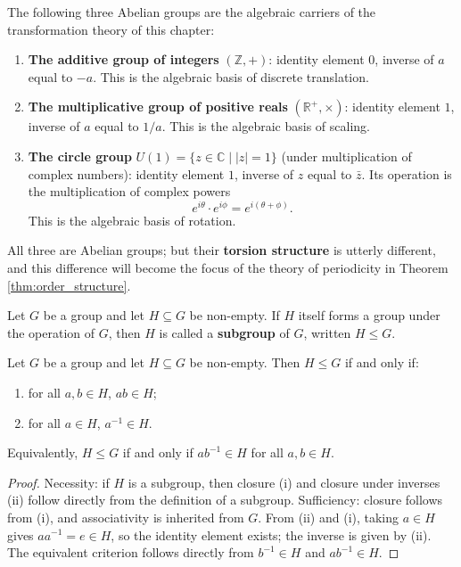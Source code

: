 \begin{example}\label{ex:three_abelian_groups}
The following three Abelian groups are the algebraic carriers of the transformation theory of this chapter:
\begin{enumerate}[label=(\roman*)]
    \item \textbf{The additive group of integers} $(\mathbb{Z},+)$: identity element $0$, inverse of $a$ equal to $-a$. This is the algebraic basis of discrete translation.
    \item \textbf{The multiplicative group of positive reals} $(\mathbb{R}^+,\times)$: identity element $1$, inverse of $a$ equal to $1/a$. This is the algebraic basis of scaling.
    \item \textbf{The circle group} $U(1)=\{z\in\mathbb{C}\mid |z|=1\}$ (under multiplication of complex numbers): identity element $1$, inverse of $z$ equal to $\bar z$. Its operation is the multiplication of complex powers
    \[
    e^{i\theta}\cdot e^{i\phi}=e^{i(\theta+\phi)}.
    \]
    This is the algebraic basis of rotation.
\end{enumerate}
All three are Abelian groups; but their \textbf{torsion structure} is utterly different, and this difference will become the focus of the theory of periodicity in Theorem \ref{thm:order_structure}.
\end{example}

\begin{definition}[Subgroup]\label{def:subgroup}
Let $G$ be a group and let $H\subseteq G$ be non-empty. If $H$ itself forms a group under the operation of $G$, then $H$ is called a \textbf{subgroup} of $G$, written $H\le G$.
\end{definition}

\begin{proposition}\label{prop:subgroup_criterion}
Let $G$ be a group and let $H\subseteq G$ be non-empty. Then $H\le G$ if and only if:
\begin{enumerate}[label=(\roman*)]
    \item for all $a,b\in H$, $ab\in H$;
    \item for all $a\in H$, $a^{-1}\in H$.
\end{enumerate}
Equivalently, $H\le G$ if and only if $ab^{-1}\in H$ for all $a,b\in H$.
\end{proposition}

\begin{proof}
Necessity: if $H$ is a subgroup, then closure (i) and closure under inverses (ii) follow directly from the definition of a subgroup. Sufficiency: closure follows from (i), and associativity is inherited from $G$. From (ii) and (i), taking $a\in H$ gives $aa^{-1}=e\in H$, so the identity element exists; the inverse is given by (ii). The equivalent criterion follows directly from $b^{-1}\in H$ and $ab^{-1}\in H$.
\end{proof}

